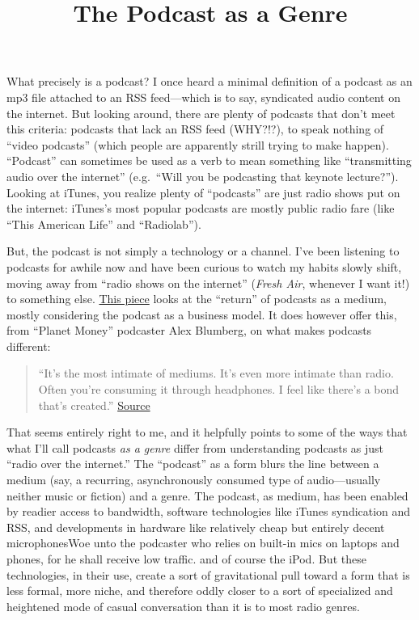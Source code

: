 \documentclass[
  12pt,
]{article}
\title{The Podcast as a Genre}
\author{}
\date{}
\begin{document}
What precisely is a podcast? I once heard a minimal definition of a
podcast as an mp3 file attached to an RSS feed---which is to say,
syndicated audio content on the internet. But looking around, there are
plenty of podcasts that don't meet this criteria: podcasts that lack an
RSS feed (WHY?!?), to speak nothing of ``video podcasts'' (which people
are apparently strill trying to make happen). ``Podcast'' can sometimes
be used as a verb to mean something like ``transmitting audio over the
internet'' (e.g.~``Will you be podcasting that keynote lecture?'').
Looking at iTunes, you realize plenty of ``podcasts'' are just radio
shows put on the internet: iTunes's most popular podcasts are mostly
public radio fare (like ``This American Life'' and ``Radiolab'').

But, the podcast is not simply a technology or a channel. I've been
listening to podcasts for awhile now and have been curious to watch my
habits slowly shift, moving away from ``radio shows on the internet''
(\emph{Fresh Air}, whenever I want it!) to something else.
\href{http://niemanstoryboard.org/stories/finding-the-tribe/}{This
piece} looks at the ``return'' of podcasts as a medium, mostly
considering the podcast as a business model. It does however offer this,
from ``Planet Money'' podcaster Alex Blumberg, on what makes podcasts
different:

\begin{quote}
``It's the most intimate of mediums. It's even more intimate than radio.
Often you're consuming it through headphones. I feel like there's a bond
that's created.''
\href{http://niemanstoryboard.org/stories/finding-the-tribe/}{Source}
\end{quote}

That seems entirely right to me, and it helpfully points to some of the
ways that what I'll call podcasts \emph{as a genre} differ from
understanding podcasts as just ``radio over the internet.'' The
``podcast'' as a form blurs the line between a medium (say, a recurring,
asynchronously consumed type of audio---usually neither music or
fiction) and a genre. The podcast, as medium, has been enabled by
readier access to bandwidth, software technologies like iTunes
syndication and RSS, and developments in hardware like relatively cheap
but entirely decent microphones{Woe unto the podcaster who relies on
built-in mics on laptops and phones, for he shall receive low traffic.}
and of course the iPod. But these technologies, in their use, create a
sort of gravitational pull toward a form that is less formal, more
niche, and therefore oddly closer to a sort of specialized and
heightened mode of casual conversation than it is to most radio genres.
\end{document}
